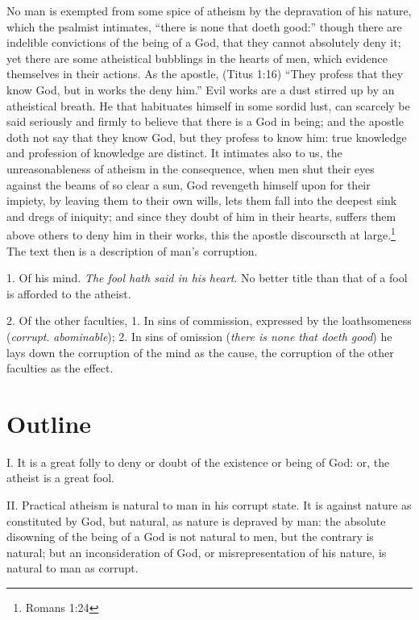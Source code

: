 \documentclass[a5paper]{book}
\begin{document}
No man is exempted from some spice of atheism by the depravation of his nature,
    which the psalmist intimates, 
    ``there is none that doeth good:''
    though there are indelible convictions of the being of a God,
    that they cannot absolutely deny it; 
    yet there are some atheistical bubblings in the hearts of men, 
    which evidence themselves in their actions. 
As the apostle, (Titus 1:16) ``They profess that they know God, 
    but in works the deny him.'' 
Evil works are a dust stirred up by an atheistical breath. 
He that habituates himself in some sordid lust, 
    can scarcely be said seriously and firmly to believe 
    that there is a God in being; 
    and the apostle doth not say that they know God, 
    but they profess to know him: 
    true knowledge and profession of knowledge are distinct.
It intimates also to us, 
    the unreasonableness of atheism in the consequence, 
    when men shut their eyes against the beams of so clear a sun,
    God revengeth himself upon for their impiety, 
    by leaving them to their own wills, 
    lets them fall into the deepest sink and dregs of iniquity; 
    and since they doubt of him in their hearts, 
    suffers them above others to deny him in their works, 
    this the apostle discourscth at large.\footnote{Romans 1:24}
The text then is a description of man’s corruption.

1. Of his mind. \emph{The fool hath said in his heart}. 
    No better title than that of a fool is afforded to the atheist.

2. Of the other faculties, 
    1. In sins of commission, expressed by the loathsomeness
    (\emph{corrupt}. \emph{abominable}); 
    2. In sins of omission (\emph{there is none that doeth good})
    he lays down the corruption of the mind as the cause,
    the corruption of the other faculties as the effect.

\section{Outline}
I. It is a great folly to deny or doubt of the existence or being of God:
    or, the atheist is a great fool.

II. Practical atheism is natural to man in his corrupt state. 
It is against nature as constituted by God, but natural, 
    as nature is depraved by man: 
    the absolute disowning of the being of a God is not natural to men, 
    but the contrary is natural; 
    but an inconsideration of God, or misrepresentation of his nature, 
    is natural to man as corrupt.
\end{document}
